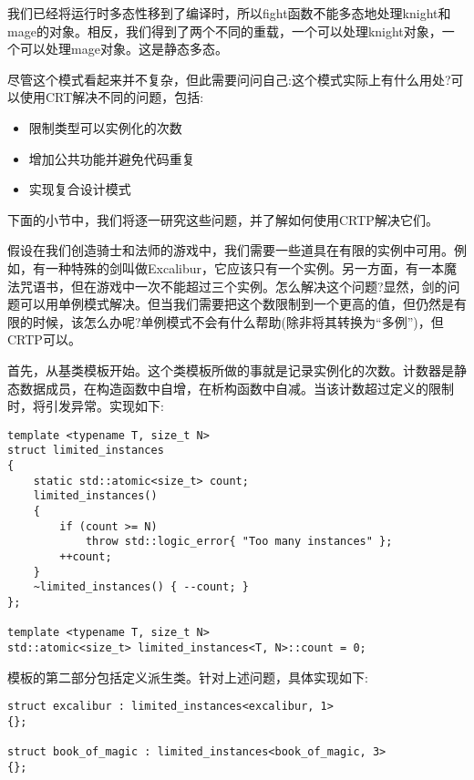 我们已经将运行时多态性移到了编译时，所以fight函数不能多态地处理knight和mage的对象。相反，我们得到了两个不同的重载，一个可以处理knight对象，一个可以处理mage对象。这是静态多态。

尽管这个模式看起来并不复杂，但此需要问问自己:这个模式实际上有什么用处?可以使用CRT解决不同的问题，包括:

\begin{itemize}
\item
限制类型可以实例化的次数

\item
增加公共功能并避免代码重复

\item
实现复合设计模式
\end{itemize}

下面的小节中，我们将逐一研究这些问题，并了解如何使用CRTP解决它们。


假设在我们创造骑士和法师的游戏中，我们需要一些道具在有限的实例中可用。例如，有一种特殊的剑叫做Excalibur，它应该只有一个实例。另一方面，有一本魔法咒语书，但在游戏中一次不能超过三个实例。怎么解决这个问题?显然，剑的问题可以用单例模式解决。但当我们需要把这个数限制到一个更高的值，但仍然是有限的时候，该怎么办呢?单例模式不会有什么帮助(除非将其转换为“多例”)，但CRTP可以。

首先，从基类模板开始。这个类模板所做的事就是记录实例化的次数。计数器是静态数据成员，在构造函数中自增，在析构函数中自减。当该计数超过定义的限制时，将引发异常。实现如下:

\begin{lstlisting}[style=styleCXX]
template <typename T, size_t N>
struct limited_instances
{
	static std::atomic<size_t> count;
	limited_instances()
	{
		if (count >= N)
			throw std::logic_error{ "Too many instances" };
		++count;
	}
	~limited_instances() { --count; }
};

template <typename T, size_t N>
std::atomic<size_t> limited_instances<T, N>::count = 0;
\end{lstlisting}

模板的第二部分包括定义派生类。针对上述问题，具体实现如下:

\begin{lstlisting}[style=styleCXX]
struct excalibur : limited_instances<excalibur, 1>
{};

struct book_of_magic : limited_instances<book_of_magic, 3>
{};
\end{lstlisting}

